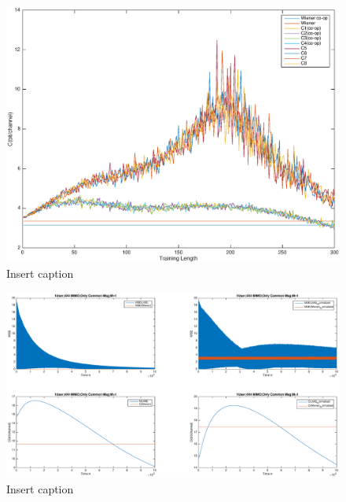 \documentclass[11pt, oneside]{article}   	%
\begin{document}
\begin{figure}[bp!]
    \centering
    \includegraphics[width=150mm]{01}
    \caption{Insert caption}
\end{figure} 

\begin{figure}[bp!]
    \centering
    \centerline{\includegraphics[width=220mm]{1USER_4X4MIMO}}
    \caption{Insert caption}
\end{figure} 
\end{document}
